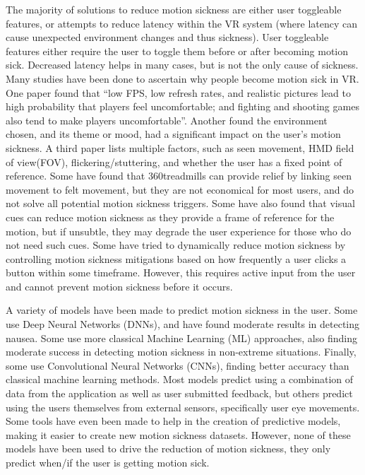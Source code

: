 The majority of solutions to reduce motion sickness are either user toggleable features, or attempts to reduce latency within the VR system\cite{kundu2021study} (where latency can cause unexpected environment changes and thus sickness).
User toggleable features either require the user to toggle them before or after becoming motion sick.
Decreased latency helps in many cases, but is not the only cause of sickness.
Many studies have been done to ascertain why people become motion sick in VR\@.
One paper found that ``low FPS, low refresh rates, and realistic pictures lead to high probability that players feel uncomfortable; and fighting and shooting games also tend to make players uncomfortable''\cite{9236907}.
Another found the environment chosen, and its theme or mood, had a significant impact on the user's motion sickness\cite{9133071}.
A third paper lists multiple factors, such as seen movement, HMD field of view(FOV), flickering/stuttering, and whether the user has a fixed point of reference\cite{doi:10.1080/10447318.2020.1778351}.
Some have found that 360\textdegree treadmills can provide relief\cite{10.1117/12.2626662} by linking seen movement to felt movement, but they are not economical for most users, and do not solve all potential motion sickness triggers.
Some have also found that visual cues can reduce motion sickness\cite{10.1145/3544999.3552489} as they provide a frame of reference for the motion, but if unsubtle, they may degrade the user experience for those who do not need such cues.
Some have tried to dynamically reduce motion sickness by controlling motion sickness mitigations based on how frequently a user clicks a button within some timeframe\cite{info:doi/10.2196/36397}.
However, this requires active input from the user and cannot prevent motion sickness before it occurs.

A variety of models have been made to predict motion sickness in the user.
Some use Deep Neural Networks (DNNs)\cite{8613651}, and have found moderate results in detecting nausea.
Some use more classical Machine Learning (ML) approaches\cite{8267239}, also finding moderate success in detecting motion sickness in non-extreme situations.
Finally, some use Convolutional Neural Networks (CNNs)\cite{8642906}, finding better accuracy than classical machine learning methods.
Most models predict using a combination of data from the application as well as user submitted feedback, but others predict using the users themselves from external sensors, specifically user eye movements\cite{9234030,https://doi.org/10.1111/cgf.14703}.
Some tools have even been made to help in the creation of predictive models\cite{10.1145/3526113.3545656}, making it easier to create new motion sickness datasets.
However, none of these models have been used to drive the reduction of motion sickness, they only predict when/if the user is getting motion sick.

